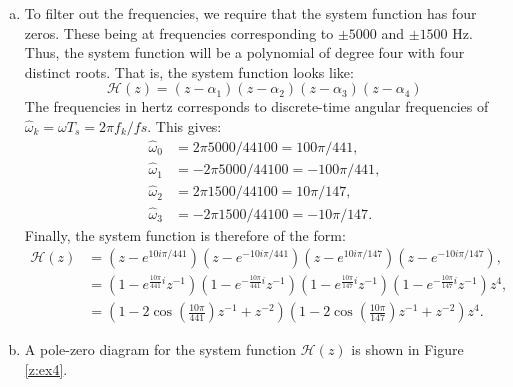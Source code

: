 \begin{enumerate}
          \begin{enumerate}[a)]
              \item To filter out the frequencies, we require that the system function has four zeros. These being at frequencies corresponding to $\pm5000$ and $\pm1500$ Hz.
                    Thus, the system function will be a polynomial of degree four with four distinct roots. That is, the system function looks like:
                    \[ \mathcal{H}(z)=(z-\alpha_1)(z-\alpha_2)(z-\alpha_3)(z-\alpha_4) \]
                    The frequencies in hertz corresponds to discrete-time angular frequencies of $\hat{\omega}_k=\omega T_s=2\pi f_k/fs$. This gives:
                    \begin{align*}
                        \hat{\omega}_{0} & =  2\pi5000/44100 =  100\pi/441, \\
                        \hat{\omega}_{1} & = -2\pi5000/44100 = -100\pi/441, \\
                        \hat{\omega}_{2} & =  2\pi1500/44100 =  10\pi/147,  \\
                        \hat{\omega}_{3} & = -2\pi1500/44100 = -10\pi/147.
                    \end{align*}
                    Finally, the system function is therefore of the form:
                    \begin{align*}
                        \mathcal{H}(z) & =(z-e^{10i\pi/441})(z-e^{-10i\pi/441})(z-e^{10i\pi/147})(z-e^{-10i\pi/147}),                                                              \\
                                       & =(1-e^{\frac{10\pi}{441}i}z^{-1})(1-e^{-\frac{10\pi}{441}i}z^{-1})(1-e^{\frac{10\pi}{147}i}z^{-1})(1-e^{-\frac{10\pi}{147}i}z^{-1})z^{4}, \\
                                       & =(1-2\cos\left(\frac{10\pi}{441}\right)z^{-1}+z^{-2})(1-2\cos\left(\frac{10\pi}{147}\right)z^{-1}+z^{-2})z^{4}.
                    \end{align*}

              \item A pole-zero diagram for the system function $\mathcal{H}(z)$ is shown in Figure \ref{z:ex4}.


\end{enumerate}
\end{enumerate}
